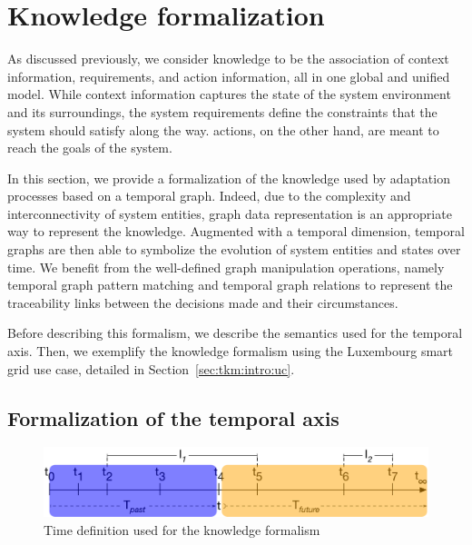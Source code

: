 \section{Knowledge formalization}
\label{sec:tkm:k-formalism}
 
As discussed previously, we consider \gls{knowledge} to be the association of \gls{context} information, \glspl{requirement}, and \gls{action} information, all in one global and unified model.
 While \gls{context} information captures the state of the system environment and its surroundings, the system \glspl{requirement} define the constraints that the system should satisfy along the way. 
 \Glspl{action}, on the other hand, are meant to reach the goals of the system.
  
 In this section, we provide a formalization of the \gls{knowledge} used by adaptation processes based on a temporal graph. 
Indeed, due to the complexity and interconnectivity of system entities, graph data representation is an appropriate way to represent the \gls{knowledge}. 
Augmented with a temporal dimension, temporal graphs are then able to symbolize the evolution of system entities and states over time. 
We benefit from the well-defined graph manipulation operations, namely temporal graph pattern matching and temporal graph relations to represent the traceability links between the \glspl{decision} made and their \glspl{circumstance}.

Before describing this formalism, we describe the semantics used for the temporal axis.
Then, we exemplify the knowledge formalism using the Luxembourg smart grid use case, detailed in Section~\ref{sec:tkm:intro:uc}.

\subsection{Formalization of the temporal axis}
\label{sec:tkm:k-formalism:timeAxis}

\begin{figure}
   \centering
	\includegraphics[width=\textwidth]{img/chapt-tkm/formalism/formalismeTime}
	\caption{Time definition used for the knowledge formalism}
	\label{fig:tkm:formalismeTime}
\end{figure}

